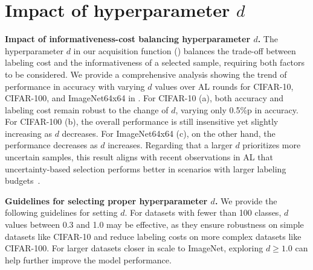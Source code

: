 

\section{Impact of hyperparameter $d$}
\label{app:ablation}

\noindent\textbf{Impact of informativeness-cost balancing hyperparameter $d$.}
The hyperparameter $d$ in our acquisition function () balances the trade-off between labeling cost and the informativeness of a selected sample, requiring both factors to be considered.
We provide a comprehensive analysis showing the trend of performance in accuracy with varying $d$ values over AL rounds for CIFAR-10, CIFAR-100, and ImageNet64x64 in . For CIFAR-10 (a), both accuracy and labeling cost remain robust to the change of $d$, varying only 0.5\%p in accuracy. For CIFAR-100 (b), the overall performance is still insensitive yet slightly increasing as $d$ decreases. For ImageNet64x64 (c), on the other hand, the performance decreases as $d$ increases.
Regarding that a larger $d$ prioritizes more uncertain samples, this result aligns with recent observations in AL that uncertainty-based selection performs better in scenarios with larger labeling budgets~\citep{hacohen2022active}.

\noindent\textbf{Guidelines for selecting proper hyperparameter $d$.}
We provide the following guidelines for setting $d$. For datasets with fewer than 100 classes, $d$ values between 0.3 and 1.0 may be effective, as they ensure robustness on simple datasets like CIFAR-10 and reduce labeling costs on more complex datasets like CIFAR-100. For larger datasets closer in scale to ImageNet, exploring $d \geq 1.0$ can help further improve the model performance.


